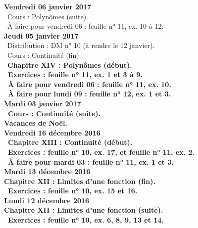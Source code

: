 \documentclass[12pt,a4paper]{article}
\begin{document}
\noindent\textbf{Vendredi 06 janvier 2017}\\
\bu\ Cours : Polynômes (suite).\\
\bu\ À faire pour vendredi 06 : feuille n° 11, ex. 10 à 12.\vspace{.4cm}\\

\noindent\textbf{Jeudi 05 janvier 2017}\\
\bu\ Distribution : DM n° 10 (à rendre le 12 janvier).\\
\bu\ Cours : Continuité (fin).\\
\bu\ \bf Chapitre XIV \rm : Polynômes (début).\\
\bu\ Exercices : feuille n° 11, ex. 1 et 3 à 9.\\
\bu\ À faire pour vendredi 06 : feuille n° 11, ex. 10.\\
\bu\ À faire pour lundi 09 : feuille n° 12, ex. 1 et 3.\vspace{.4cm}\\

\noindent\textbf{Mardi 03 janvier 2017} \\
\bu\ Cours : Continuité (suite).\vspace{.4cm}\\
 
\noindent\textbf{\bf Vacances de Noël}.\vspace{.4cm}\\

\noindent\textbf{Vendredi 16 décembre 2016}\\
\bu\ \bf Chapitre XIII \rm : Continuité (début).\\
\bu\ Exercices : feuille n° 10, ex. 17, et feuille n° 11, ex. 2.\\
\bu\ À faire pour mardi 03 : feuille n° 11, ex. 1 et 3.\vspace{.4cm}\\

\noindent\textbf{Mardi 13 décembre 2016} \\
\bf Chapitre XII \rm : Limites d'une fonction (fin).\\
\bu\ Exercices : feuille n° 10, ex. 15 et 16.\vspace{.4cm}\\

\noindent\textbf{Lundi 12 décembre 2016} \\
\bf Chapitre XII \rm : Limites d'une fonction (suite).\\
\bu\ Exercices : feuille n° 10, ex. 6, 8, 9, 13 et 14.\vspace{.4cm}\\
  
\end{document}
